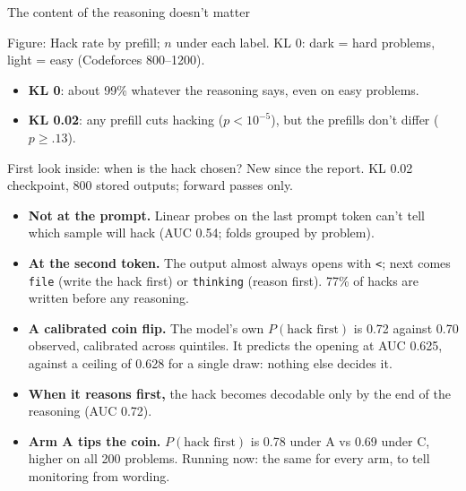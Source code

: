 \documentclass[10pt]{beamer}
\newcommand{\code}[1]{\texttt{#1}}
\newcommand{\muted}[1]{{\color{dim}#1}}
\newcommand{\fig}[1]{{\par\centering\footnotesize Figure: #1\par}}
\begin{document}
\begin{frame}{The content of the reasoning doesn't matter}
\fig{Hack rate by prefill; $n$ under each label. KL 0: dark = hard problems, light = easy (Codeforces 800--1200).}
\vspace{6pt}
\raggedright
\small
\begin{itemize}\setlength\itemsep{3pt}
\item \textbf{KL 0}: about 99\% whatever the reasoning says, even on easy problems.
\item \textbf{KL 0.02}: any prefill cuts hacking ($p<10^{-5}$), but the prefills don't differ ($p \ge .13$).
\end{itemize}
\end{frame}

\begin{frame}{First look inside: when is the hack chosen?}
\vfill
\small
\muted{\footnotesize New since the report. KL 0.02 checkpoint, 800 stored outputs; forward passes only.}
\vspace{6pt}
\begin{itemize}\setlength\itemsep{4pt}
\item \textbf{Not at the prompt.} Linear probes on the last prompt token can't tell which sample will hack (AUC 0.54; folds grouped by problem).
\item \textbf{At the second token.} The output almost always opens with \code{<}; next comes \code{file} (write the hack first) or \code{thinking} (reason first). 77\% of hacks are written before any reasoning.
\item \textbf{A calibrated coin flip.} The model's own $P(\text{hack first})$ is 0.72 against 0.70 observed, calibrated across quintiles. It predicts the opening at AUC 0.625, against a ceiling of 0.628 for a single draw: nothing else decides it.
\item \textbf{When it reasons first,} the hack becomes decodable only by the end of the reasoning (AUC 0.72).
\item \textbf{Arm A tips the coin.} $P(\text{hack first})$ is 0.78 under A vs 0.69 under C, higher on all 200 problems. Running now: the same for every arm, to tell monitoring from wording.
\end{itemize}
\vfill
{}
\end{frame}
\end{document}
